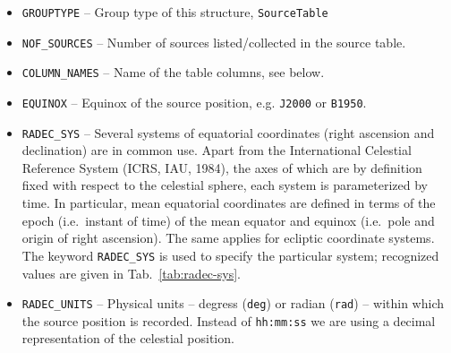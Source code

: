\documentclass[a4paper,10pt,bibtotoc]{scrartcl}
\begin{document}
\begin{itemize}
\item \verb|GROUPTYPE| -- Group type of this structure, \texttt{SourceTable}
\item \verb|NOF_SOURCES| -- Number of sources listed/collected in the source table.
\item \verb|COLUMN_NAMES| -- Name of the table columns, see below.
\item \verb|EQUINOX| -- Equinox of the source position, e.g. \texttt{J2000} or \texttt{B1950}.
\item \verb|RADEC_SYS| -- Several systems of equatorial coordinates
  (right ascension and declination) are in common use. Apart from the
  International Celestial Reference System (ICRS, IAU, 1984), the axes
  of which are by definition fixed with respect to the celestial sphere, each
  system is parameterized by time. In particular, mean equatorial
  coordinates are defined in terms of the epoch (i.e.~instant of
  time) of the mean equator and equinox (i.e.~pole and origin of
  right ascension). The same applies for ecliptic coordinate
  systems. The keyword \verb|RADEC_SYS| is used to specify the
  particular system; recognized values are given in
  Tab.~\ref{tab:radec-sys}.
\item \verb|RADEC_UNITS| -- Physical units -- degress (\texttt{deg}) or radian (\texttt{rad})  -- within which the source position is recorded. Instead of \texttt{hh:mm:ss} we are using a decimal representation of the celestial position.
\end{itemize}
\end{document}
